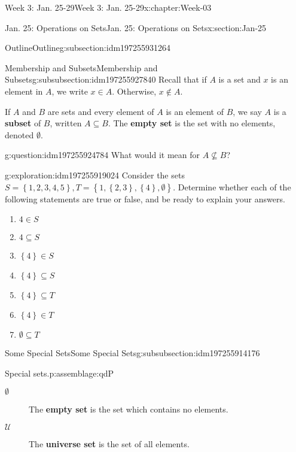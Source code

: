 \documentclass[oneside,10pt,]{book}
\newcommand{\terminology}[1]{\textbf{#1}}
\numberwithin{equation}{section}
\newcommand{\set}[1]{\left\{ {#1} \right\}}
\def\U{{\mathcal U}}
\newcommand{\U}{\mathcal U}
\begin{document}
\begin{chapterptx}{Week 3: Jan. 25-29}{}{Week 3: Jan. 25-29}{}{}{x:chapter:Week-03}
\begin{sectionptx}{Jan. 25: Operations on Sets}{}{Jan. 25: Operations on Sets}{}{}{x:section:Jan-25}
\begin{subsectionptx}{Outline}{}{Outline}{}{}{g:subsection:idm197255931264}
\typeout{************************************************}
%
\begin{subsubsectionptx}{Membership and Subsets}{}{Membership and Subsets}{}{}{g:subsubsection:idm197255927840}
Recall that if \(A\) is a set and \(x\) is an element in \(A\), we write \(x\in A\). Otherwise, \(x\notin A\).%
\par
If \(A\) and \(B\) are sets and every element of \(A\) is an element of \(B\), we say \(A\) is a \terminology{subset} of \(B\), written \(A\subseteq B\). The \terminology{empty set} is the set with no elements, denoted \(\emptyset\).%
\begin{question}{}{g:question:idm197255924784}%
What would it mean for \(A\not\subseteq B\)?%
\end{question}
\begin{exploration}{}{g:exploration:idm197255919024}%
Consider the sets \(S = \set{1,2,3,4,5}, T = \set{1,\set{2,3},\set{4},\emptyset}\). Determine whether each of the following statements are true or false, and be ready to explain your answers. %
%
\begin{enumerate}
\item{}\(\displaystyle 4 \in S\)%
\item{}\(\displaystyle 4\subseteq S\)%
\item{}\(\displaystyle \set{4}\in S\)%
\item{}\(\displaystyle \set{4}\subseteq S\)%
\item{}\(\displaystyle \set{4}\subseteq T\)%
\item{}\(\displaystyle \set{4}\in T\)%
\item{}\(\displaystyle \emptyset\subseteq T\)%
\end{enumerate}
\end{exploration}%
\end{subsubsectionptx}
%
%
\typeout{************************************************}
\typeout{************************************************}
%
\begin{subsubsectionptx}{Some Special Sets}{}{Some Special Sets}{}{}{g:subsubsection:idm197255914176}
\begin{assemblage}{Special sets.}{p:assemblage:qdP}%
%
\begin{description}
\item[{\(\emptyset\)}]The \terminology{empty set} is the set which contains no elements. \label{g:notation:idm197255910032}%
\item[{\(\U\)}]The \terminology{universe set} is the set of all elements. \label{g:notation:idm197255906240}%

\end{description}
\end{assemblage}
\end{subsubsectionptx}
\end{subsectionptx}
\end{sectionptx}
\end{chapterptx}
\end{document}
